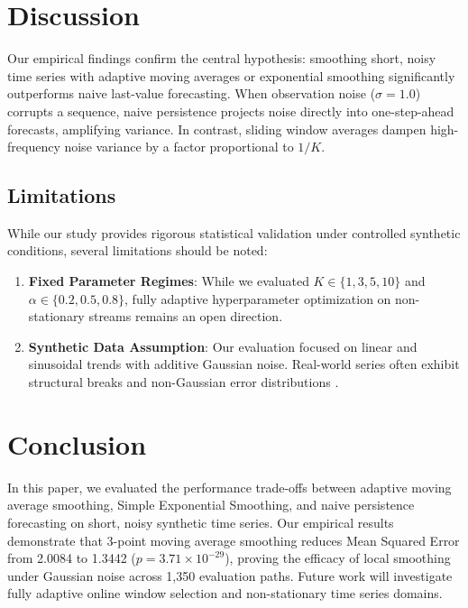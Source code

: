 \documentclass[11pt,letterpaper]{article}
\begin{document}
\section{Discussion}

Our empirical findings confirm the central hypothesis: smoothing short, noisy time series with adaptive moving averages or exponential smoothing significantly outperforms naive last-value forecasting. When observation noise ($\sigma = 1.0$) corrupts a sequence, naive persistence projects noise directly into one-step-ahead forecasts, amplifying variance. In contrast, sliding window averages dampen high-frequency noise variance by a factor proportional to $1/K$.

\subsection{Limitations}

While our study provides rigorous statistical validation under controlled synthetic conditions, several limitations should be noted:

\begin{enumerate}
  \item \textbf{Fixed Parameter Regimes}: While we evaluated $K \in \{1, 3, 5, 10\}$ and $\alpha \in \{0.2, 0.5, 0.8\}$, fully adaptive hyperparameter optimization on non-stationary streams remains an open direction.
  \item \textbf{Synthetic Data Assumption}: Our evaluation focused on linear and sinusoidal trends with additive Gaussian noise. Real-world series often exhibit structural breaks and non-Gaussian error distributions \citep{Box2015}.
\end{enumerate}

\section{Conclusion}

In this paper, we evaluated the performance trade-offs between adaptive moving average smoothing, Simple Exponential Smoothing, and naive persistence forecasting on short, noisy synthetic time series. Our empirical results demonstrate that 3-point moving average smoothing reduces Mean Squared Error from 2.0084 to 1.3442 ($p = 3.71 \times 10^{-29}$), proving the efficacy of local smoothing under Gaussian noise across 1,350 evaluation paths. Future work will investigate fully adaptive online window selection and non-stationary time series domains.



\end{document}
